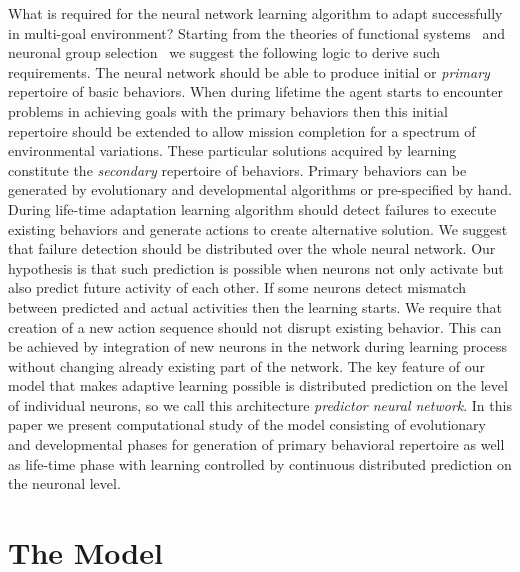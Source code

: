 \documentclass[letterpaper]{article}
\begin{document}
What is required for the neural network learning algorithm to adapt successfully in multi-goal environment? Starting from the theories of functional systems~\citep{Anokhin1974} and neuronal group selection~\citep{Edelman1993} we suggest the following logic to derive such requirements. The neural network should be able to produce initial or \textit{primary} repertoire of basic behaviors. When during lifetime the agent starts to encounter problems in achieving goals with the primary behaviors then this initial repertoire should be extended to allow mission completion for a spectrum of environmental variations. These particular solutions acquired by learning constitute the \textit{secondary} repertoire of behaviors. Primary behaviors can be generated by evolutionary and developmental algorithms or pre-specified by hand. During life-time adaptation learning algorithm should detect failures to execute existing behaviors and generate actions to create alternative solution. We suggest that failure detection should be distributed over the whole neural network. Our hypothesis is that such prediction is possible when neurons not only activate but also predict future activity of each other. If some neurons detect mismatch between predicted and actual activities then the learning starts. We require that creation of a new action sequence should not disrupt existing behavior. This can be achieved by integration of new neurons in the network during learning process without changing already existing part of the network. The key feature of our model that makes adaptive learning possible is distributed prediction on the level of individual neurons, so we call this architecture \textit{predictor neural network}. In this paper we present computational study of the model consisting of evolutionary and developmental phases for generation of primary behavioral repertoire as well as life-time phase with learning controlled by continuous distributed prediction on the neuronal level. %


\section{The Model}
\end{document}
